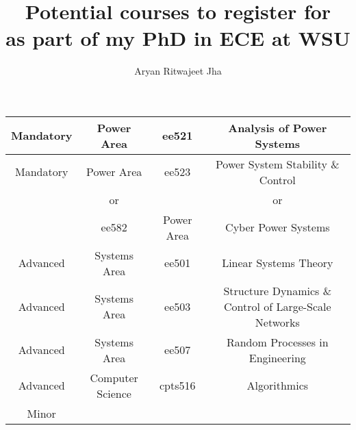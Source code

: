 \documentclass{article}
\author{Aryan Ritwajeet Jha}
\date{}
\title{Potential courses to register for \\ as part of my PhD in ECE at WSU}
\begin{document}
	\maketitle
	
	\begin{tabular}{|c|c|c|c}
		\hline
		Mandatory & Power Area & ee521 & Analysis of Power Systems \\
		\hline
		Mandatory & Power Area & ee523 & Power System Stability \& Control \\
		 & or &  & or \\
		 & ee582 & Power Area & Cyber Power Systems \\
		 \hline
		Advanced & Systems Area & ee501 & Linear Systems Theory \\ 
		\hline
		Advanced & Systems Area & ee503 & Structure Dynamics \& Control of Large-Scale Networks  \\ \hline
		Advanced& Systems Area  & ee507 & Random Processes in Engineering \\ \hline
		Advanced& Computer Science  & cpts516 & Algorithmics \\
		\hline
		Minor
	\end{tabular}
\end{document}
